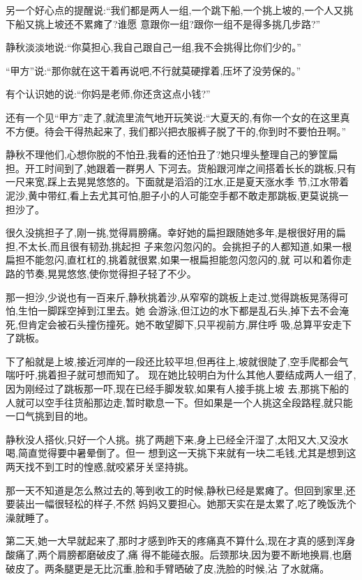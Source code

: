 ﻿\documentclass[12pt]{article}
\begin{document}
另一个好心点的提醒说:``我们都是两人一组,一个跳下船,一个挑上坡的,一个人又挑下船又挑上坡还不累瘫了?谁愿
意跟你一组?跟你一组不是得多挑几步路?''

静秋淡淡地说:``你莫担心,我自己跟自己一组,我不会挑得比你们少的。''

``甲方''说:``那你就在这干着再说吧,不行就莫硬撑着,压坏了没劳保的。''

有个认识她的说:``你妈是老师,你还贪这点小钱?''

还有一个见``甲方''走了,就流里流气地开玩笑说:``大夏天的,有你一个女的在这里真不方便。待会干得热起来了,
我们都兴把衣服裤子脱了干的,你到时不要怕丑啊。''

静秋不理他们,心想你脱的不怕丑,我看的还怕丑了?她只埋头整理自己的箩筐扁担。开工时间到了,她跟着一群男人
下河去。货船跟河岸之间搭着长长的跳板,只有一尺来宽,踩上去晃晃悠悠的。下面就是滔滔的江水,正是夏天涨水季
节,江水带着泥沙,黄中带红,看上去尤其可怕,胆子小的人可能空手都不敢走那跳板,更莫说挑一担沙了。

很久没挑担子了,刚一挑,觉得肩膀痛。幸好她的扁担跟随她多年,是根很好用的扁担,不太长,而且很有韧劲,挑起担
子来忽闪忽闪的。会挑担子的人都知道,如果一根扁担不能忽闪,直杠杠的,挑着就很累,如果一根扁担能忽闪忽闪的,就
可以和着你走路的节奏,晃晃悠悠,使你觉得担子轻了不少。

那一担沙,少说也有一百来斤,静秋挑着沙,从窄窄的跳板上走过,觉得跳板晃荡得可怕,生怕一脚踩空掉到江里去。她
会游泳,但江边的水下都是乱石头,掉下去不会淹死,但肯定会被石头撞伤撞死。她不敢望脚下,只平视前方,屏住呼
吸,总算平安走下了跳板。

下了船就是上坡,接近河岸的一段还比较平坦,但再往上,坡就很陡了,空手爬都会气喘吁吁,挑着担子就可想而知了。
现在她比较明白为什么其他人要结成两人一组了,因为刚经过了跳板那一吓,现在已经手脚发软,如果有人接手挑上坡
去,那挑下船的人就可以空手往货船那边走,暂时歇息一下。但如果是一个人挑这全段路程,就只能一口气挑到目的地。

静秋没人搭伙,只好一个人挑。挑了两趟下来,身上已经全汗湿了,太阳又大,又没水喝,简直觉得要中暑晕倒了。但一
想到这一天挑下来就有一块二毛钱,尤其是想到这两天找不到工时的惶惑,就咬紧牙关坚持挑。

那一天不知道是怎么熬过去的,等到收工的时候,静秋已经是累瘫了。但回到家里,还要装出一幅很轻松的样子,不然
妈妈又要担心。她那天实在是太累了,吃了晚饭洗个澡就睡了。

第二天,她一大早就起来了,那时才感到昨天的疼痛真不算什么,现在才真的感到浑身酸痛了,两个肩膀都磨破皮了,痛
得不能碰衣服。后颈那块,因为要不断地换肩,也磨破皮了。两条腿更是无比沉重,脸和手臂晒破了皮,洗脸的时候,沾
了水就痛。
\end{document}
